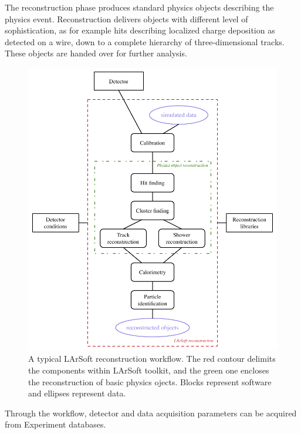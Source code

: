 The reconstruction phase produces standard physics objects describing the physics event.
Reconstruction delivers objects with different level of sophistication,
as for example hits describing localized charge deposition as detected on a wire,
down to a complete hierarchy of three-dimensional tracks.
These objects are handed over for further analysis.
\begin{figure}
   \centering
   \includegraphics{figures/LArSoftReconstructionWorkflow.pdf}
   \caption{\label{fig:LArSoftReconstruction}
      A typical LArSoft reconstruction workflow.
      The red contour delimits the components within LArSoft toolkit,
      and the green one encloses the reconstruction of basic physics ojects.
      Blocks represent software and ellipses represent data.
}
\end{figure}
Through the workflow, detector and data acquisition parameters
can be acquired from Experiment databases.

